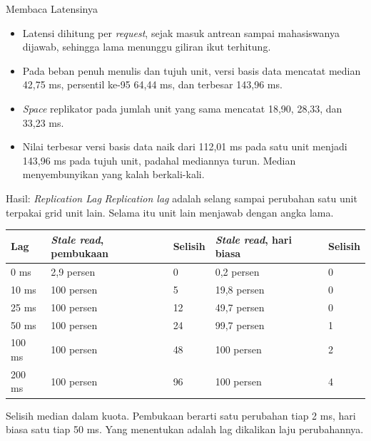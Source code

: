 \documentclass[aspectratio=169, table, 12pt]{beamer}
\begin{document}
\begin{frame}{{\Large Membaca Latensinya}}
  \vspace{10pt}
  \begin{itemize}\small
    \item Latensi dihitung per \textit{request}, sejak masuk antrean sampai
          mahasiswanya dijawab, sehingga lama menunggu giliran ikut terhitung.
    \item Pada beban penuh menulis dan tujuh unit, versi basis data mencatat
          median 42,75 ms, persentil ke-95 64,44 ms, dan terbesar 143,96 ms.
    \item \textit{Space} replikator pada jumlah unit yang sama mencatat 18,90,
          28,33, dan 33,23 ms.
    \item Nilai terbesar versi basis data naik dari 112,01 ms pada satu unit
          menjadi 143,96 ms pada tujuh unit, padahal mediannya turun. Median
          menyembunyikan yang kalah berkali-kali.
  \end{itemize}
\end{frame}

\begin{frame}{{\Large Hasil: \textit{Replication Lag}}}
  \vspace{16pt}
  {\small \textit{Replication lag} adalah selang sampai perubahan satu unit
  terpakai grid unit lain. Selama itu unit lain menjawab dengan angka lama.}

  \vspace{4pt}
  \centering
  \footnotesize
  \begin{tabularx}{0.9\textwidth}{|l|X|l|X|l|}
    \hline
    \textbf{Lag} & \textbf{\textit{Stale read}, pembukaan} & \textbf{Selisih} & \textbf{\textit{Stale read}, hari biasa} & \textbf{Selisih} \\
    \hline
    0 ms & 2,9 persen & 0 & 0,2 persen & 0 \\
    \hline
    10 ms & 100 persen & 5 & 19,8 persen & 0 \\
    \hline
    25 ms & 100 persen & 12 & 49,7 persen & 0 \\
    \hline
    50 ms & 100 persen & 24 & 99,7 persen & 1 \\
    \hline
    100 ms & 100 persen & 48 & 100 persen & 2 \\
    \hline
    200 ms & 100 persen & 96 & 100 persen & 4 \\
    \hline
  \end{tabularx}

  \vspace{6pt}
  \raggedright
  {\small Selisih median dalam kuota. Pembukaan berarti satu perubahan tiap 2
  ms, hari biasa satu tiap 50 ms. Yang menentukan adalah lag dikalikan laju
  perubahannya.}
\end{frame}
\end{document}
